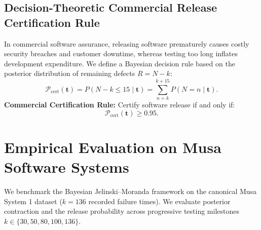 \documentclass[11pt,a4paper]{article}
\begin{document}
\subsection{Decision-Theoretic Commercial Release Certification Rule}
In commercial software assurance, releasing software prematurely causes costly security breaches and customer downtime, whereas testing too long inflates development expenditure. We define a Bayesian decision rule based on the posterior distribution of remaining defects $R = N - k$:
\begin{equation}
\mathcal{P}_{\text{cert}}(\mathbf{t}) = P(N - k \le 15 \mid \mathbf{t}) = \sum_{n=k}^{k+15} P(N = n \mid \mathbf{t}).
\end{equation}
\textbf{Commercial Certification Rule:} Certify software release if and only if:
\begin{equation}
\mathcal{P}_{\text{cert}}(\mathbf{t}) \ge 0.95.
\end{equation}

\section{Empirical Evaluation on Musa Software Systems}

We benchmark the Bayesian Jelinski--Moranda framework on the canonical Musa System 1 dataset ($k = 136$ recorded failure times). We evaluate posterior contraction and the release probability across progressive testing milestones $k \in \{30, 50, 80, 100, 136\}$.

\begin{table}[H]
\centering
\caption{Bayesian Jelinski--Moranda posterior inference and release certification on Musa System 1.}
\label{tab:jm_results}
\end{table}
\end{document}
